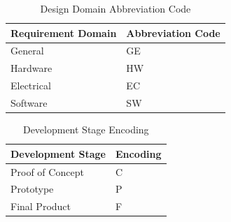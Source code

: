\bgroup
\def\arraystretch{1.5}
\begin{table}[H]
\centering
\begin{tabular}{ | m{7cm} | m{7cm}| } 
\hline
\rowcolor{lightgray} \textbf{Requirement Domain} & \textbf{Abbreviation Code} \\ 
\hline
 General & GE\\ 
\hline
 Hardware & HW\\ 
\hline
 Electrical & EC\\  
\hline
 Software & SW\\ 
\hline
\end{tabular}
\caption{Design  Domain Abbreviation Code}
\end{table}

\bgroup
\def\arraystretch{1.5}
\begin{table}[H]
\centering
\begin{tabular}{ | m{7cm} | m{7cm}| }
\hline
\rowcolor{lightgray} \textbf{Development Stage} & \textbf{Encoding} \\
\hline
Proof of Concept & C\\
\hline
Prototype & P\\
\hline
Final Product & F\\
\hline
\end{tabular}
\caption{Development Stage Encoding}
\end{table}	












